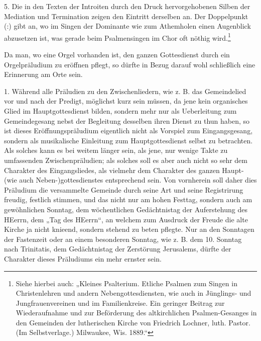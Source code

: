 5. Die in den Texten der Introiten durch den Druck hervorgehobenen Silben der Mediation und Termination zeigen den Eintritt derselben an. Der Doppelpunkt (:) gibt an, wo im Singen der Dominante wie zum Athemholen einen Augenblick abzusetzen ist, was gerade beim Psalmensingen im Chor oft nöthig wird.\footnote{Siehe hierbei auch: „Kleines Psalterium. Etliche Psalmen zum Singen in Christenlehren und andern Nebengottesdiensten, wie auch in Jünglings- und Jungfrauenvereinen und im Familienkreise. Ein geringer Beitrag zur Wiederaufnahme und zur Beförderung des altkirchlichen Psalmen-Gesanges in den Gemeinden der lutherischen Kirche von Friedrich Lochner, luth. Pastor. (Im Selbstverlage.) Milwaukee, Wis. 1889.“}

Da man, wo eine Orgel vorhanden ist, den ganzen Gottesdienst durch ein Orgelpräludium zu eröffnen pflegt, so dürfte in Bezug darauf wohl schließlich eine Erinnerung am Orte sein.

1. Während alle Präludien zu den Zwischenliedern, wie z. B. das Gemeindelied vor und nach der Predigt, möglichst kurz sein müssen, da jene
kein organisches Glied im Hauptgottesdienst bilden, sondern mehr nur als Ueberleitung zum Gemeindegesang nebst der Begleitung desselben ihren Dienst zu thun haben, so ist dieses Eröffnungspräludium eigentlich nicht als Vorspiel zum Eingangsgesang, sondern als musikalische Einleitung zum Hauptgottesdienst selbst zu betrachten. Als solches kann es bei weitem länger sein, als jene, nur wenige Takte zu umfassenden Zwischenpräludien; als solches soll es aber auch nicht so sehr dem Charakter des Eingangsliedes, als vielmehr dem Charakter des ganzen Haupt- (wie auch Neben-)gottesdienstes entsprechend sein. Von vornherein soll daher dies Präludium die versammelte Gemeinde durch seine Art und seine Registrirung freudig, festlich stimmen, und das nicht nur am hohen Festtag, sondern auch am gewöhnlichen Sonntag, dem wöchentlichen Gedächtnistag der Auferstehung des HEerrn, dem „Tag des HEerrn“, an welchem zum Ausdruck der Freude die alte Kirche ja nicht knieend, sondern stehend zu beten pflegte. Nur an den Sonntagen der Fastenzeit oder an einem besonderen Sonntag, wie z. B. dem 10. Sonntag nach Trinitatis, dem Gedächtnistag der Zerstörung Jerusalems, dürfte der Charakter dieses Präludiums ein mehr ernster sein.

